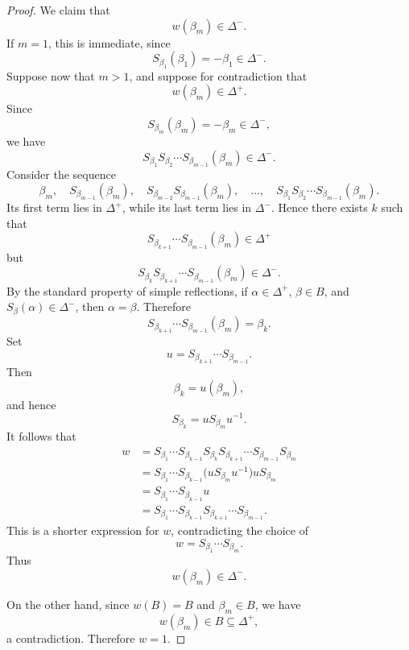 \begin{proof}
    We claim that
    \[
        w(\beta_m)\in \Delta^-.
    \]
    If \(m=1\), this is immediate, since
    \[
        S_{\beta_1}(\beta_1)=-\beta_1\in \Delta^-.
    \]
    Suppose now that \(m>1\), and suppose for contradiction that
    \[
        w(\beta_m)\in \Delta^+.
    \]
    Since
    \[
        S_{\beta_m}(\beta_m)=-\beta_m\in \Delta^-,
    \]
    we have
    \[
        S_{\beta_1}S_{\beta_2}\cdots S_{\beta_{m-1}}(\beta_m)\in \Delta^-.
    \]
    Consider the sequence
    \[
        \beta_m,\quad
        S_{\beta_{m-1}}(\beta_m),\quad
        S_{\beta_{m-2}}S_{\beta_{m-1}}(\beta_m),\quad
        \ldots,\quad
        S_{\beta_1}S_{\beta_2}\cdots S_{\beta_{m-1}}(\beta_m).
    \]
    Its first term lies in \(\Delta^+\), while its last term lies in \(\Delta^-\).
    Hence there exists \(k\) such that
    \[
        S_{\beta_{k+1}}\cdots S_{\beta_{m-1}}(\beta_m)\in \Delta^+
    \]
    but
    \[
        S_{\beta_k}S_{\beta_{k+1}}\cdots S_{\beta_{m-1}}(\beta_m)\in \Delta^-.
    \]
    By the standard property of simple reflections, if
    \(\alpha\in \Delta^+\), \(\beta\in B\), and
    \(S_\beta(\alpha)\in \Delta^-\), then \(\alpha=\beta\). Therefore
    \[
        S_{\beta_{k+1}}\cdots S_{\beta_{m-1}}(\beta_m)=\beta_k.
    \]
    Set
    \[
        u=S_{\beta_{k+1}}\cdots S_{\beta_{m-1}}.
    \]
    Then
    \[
        \beta_k=u(\beta_m),
    \]
    and hence
    \[
        S_{\beta_k}=uS_{\beta_m}u^{-1}.
    \]
    It follows that
    \[
        \begin{aligned}
            w
             & =
            S_{\beta_1}\cdots S_{\beta_{k-1}}
            S_{\beta_k}
            S_{\beta_{k+1}}\cdots S_{\beta_{m-1}}
            S_{\beta_m}                                \\
             & =
            S_{\beta_1}\cdots S_{\beta_{k-1}}
            \bigl(uS_{\beta_m}u^{-1}\bigr)uS_{\beta_m} \\
             & =
            S_{\beta_1}\cdots S_{\beta_{k-1}}u         \\
             & =
            S_{\beta_1}\cdots S_{\beta_{k-1}}
            S_{\beta_{k+1}}\cdots S_{\beta_{m-1}}.
        \end{aligned}
    \]
    This is a shorter expression for \(w\), contradicting the choice of
    \[
        w=S_{\beta_1}\cdots S_{\beta_m}.
    \]
    Thus
    \[
        w(\beta_m)\in \Delta^-.
    \]

    On the other hand, since \(w(B)=B\) and \(\beta_m\in B\), we have
    \[
        w(\beta_m)\in B\subseteq \Delta^+,
    \]
    a contradiction. Therefore \(w=1\).
\end{proof}

